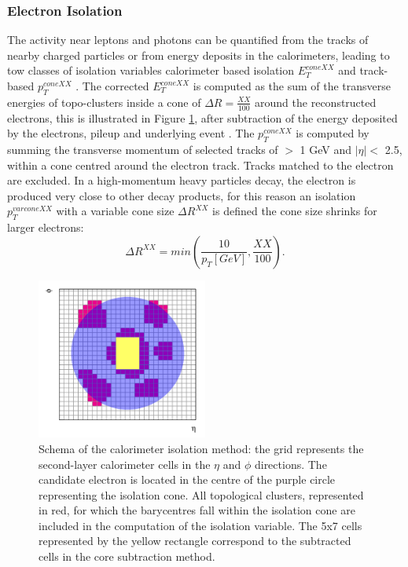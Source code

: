 \subsubsection{Electron Isolation}
\label{chap2:Objects:Egamma:EIso}
The activity near leptons and photons can be quantified from the tracks of nearby charged particles or from energy deposits in the calorimeters, leading to tow classes of isolation variables calorimeter based isolation $E^{coneXX}_{T}$ and track-based $p_T^{coneXX}$ \cite{Electron_Reco_Id_Run1}. The corrected $E^{coneXX}_{T}$ is computed as the sum of the transverse energies of topo-clusters inside a cone of $\Delta R = \frac{XX}{100}$ around the reconstructed electrons, this is illustrated in Figure \ref{fig:chap2:Objects:Egamma:EIso:Schema}, after subtraction of the energy deposited by the electrons, pileup and underlying event \cite{PileUp_IsoExtract}. The $p_T^{coneXX}$ is computed by summing the transverse momentum of selected tracks of \pT $>$ 1 GeV and $|\eta|<$ 2.5, within a cone centred around the electron track. Tracks matched to the electron are excluded. In a high-momentum heavy particles decay, the electron is produced very close to other decay products, for this reason an isolation $p_T^{varconeXX}$ with a variable cone size $\Delta R^{XX}$ is defined the cone size shrinks for larger \pT electrons:
\begin{equation}
    \Delta R^{XX} = min(\frac{10}{p_T[GeV]}, \frac{XX}{100}).
\end{equation}
\begin{figure}[ht]
    \centering
    \includegraphics[width=0.5\textwidth]{Ch2/Img/Iso_Schema.png}
    \caption{Schema of the calorimeter isolation method: the grid represents the second-layer calorimeter cells in the $\eta$ and $\phi$ directions. The candidate electron is located in the centre of the purple circle representing the isolation cone. All topological clusters, represented in red, for which the barycentres fall within the isolation cone are included in the computation of the isolation variable. The 5x7 cells represented by the yellow rectangle correspond to the subtracted cells in the core subtraction method.}
    \label{fig:chap2:Objects:Egamma:EIso:Schema}
\end{figure}
